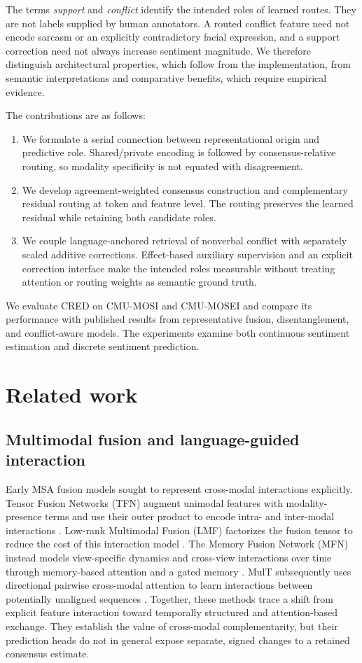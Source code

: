 \documentclass[review,12pt]{elsarticle}
\begin{document}
The terms \emph{support} and \emph{conflict} identify the intended roles of learned routes. They are not labels supplied by human annotators. A routed conflict feature need not encode sarcasm or an explicitly contradictory facial expression, and a support correction need not always increase sentiment magnitude. We therefore distinguish architectural properties, which follow from the implementation, from semantic interpretations and comparative benefits, which require empirical evidence.

The contributions are as follows:
\begin{enumerate}
\item We formulate a serial connection between representational origin and predictive role. Shared/private encoding is followed by consensus-relative routing, so modality specificity is not equated with disagreement.
\item We develop agreement-weighted consensus construction and complementary residual routing at token and feature level. The routing preserves the learned residual while retaining both candidate roles.
\item We couple language-anchored retrieval of nonverbal conflict with separately scaled additive corrections. Effect-based auxiliary supervision and an explicit correction interface make the intended roles measurable without treating attention or routing weights as semantic ground truth.
\end{enumerate}

We evaluate CRED on CMU-MOSI and CMU-MOSEI and compare its performance with published results from representative fusion, disentanglement, and conflict-aware models. The experiments examine both continuous sentiment estimation and discrete sentiment prediction.

\section{Related work}
\subsection{Multimodal fusion and language-guided interaction}
Early MSA fusion models sought to represent cross-modal interactions explicitly. Tensor Fusion Networks (TFN) augment unimodal features with modality-presence terms and use their outer product to encode intra- and inter-modal interactions \cite{tfn}. Low-rank Multimodal Fusion (LMF) factorizes the fusion tensor to reduce the cost of this interaction model \cite{lmf}. The Memory Fusion Network (MFN) instead models view-specific dynamics and cross-view interactions over time through memory-based attention and a gated memory \cite{mfn}. MulT subsequently uses directional pairwise cross-modal attention to learn interactions between potentially unaligned sequences \cite{mult}. Together, these methods trace a shift from explicit feature interaction toward temporally structured and attention-based exchange. They establish the value of cross-modal complementarity, but their prediction heads do not in general expose separate, signed changes to a retained consensus estimate.
\end{document}
